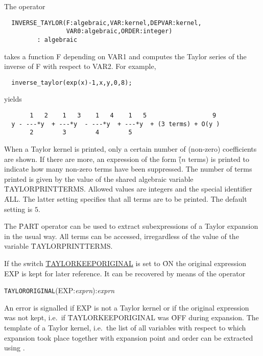 \hypertarget{operator:INVERSE_TAYLOR}{}
The operator
\begin{verbatim}
  INVERSE_TAYLOR(F:algebraic,VAR:kernel,DEPVAR:kernel,
                 VAR0:algebraic,ORDER:integer)
         : algebraic
\end{verbatim}
takes a function F depending on VAR1 and computes the Taylor series of
the inverse of F with respect to VAR2. For example,
\begin{verbatim}
  inverse_taylor(exp(x)-1,x,y,0,8);
\end{verbatim}
yields
\begin{verbatim}
       1   2    1   3    1   4    1   5                  9
  y - ---*y  + ---*y  - ---*y  + ---*y  + (3 terms) + O(y )
       2        3        4        5
\end{verbatim}


\hypertarget{reserved:TAYLORPRINTTERMS}{}
When a Taylor kernel is printed, only a certain number of (non-zero)
coefficients are shown. If there are more, an expression of the form
\f{($n$ terms)} is printed to indicate how many non-zero
terms have been suppressed. The number of terms printed is given by
the value of the shared algebraic variable \f{TAYLORPRINTTERMS}.
Allowed values are integers and the special identifier \f{ALL}. The
latter setting specifies that all terms are to be printed. The default
setting is $5$.

The \f{PART} operator can be used to extract subexpressions of a
Taylor expansion in the usual way. All terms can be accessed,
irregardless of the value of the variable \f{TAYLORPRINTTERMS}.


If the switch \hyperlink{switch:TAYLORKEEPORIGINAL}{\f{TAYLORKEEPORIGINAL}}
is set to \f{ON} the
original expression EXP is kept for later reference.
It can be recovered by means of the operator

\hypertarget{operator:TAYLORORIGINAL}{}
\hspace*{2em} \texttt{TAYLORORIGINAL}(EXP:{\em exprn}):{\em exprn}

An error is signalled if EXP is not a Taylor kernel or if the original
expression was not kept, i.e.\ if \f{TAYLORKEEPORIGINAL} was
\f{OFF} during expansion.  The template of a Taylor kernel, i.e.\
the list of all variables with respect to which expansion took place
together with expansion point and order can be extracted using
.

